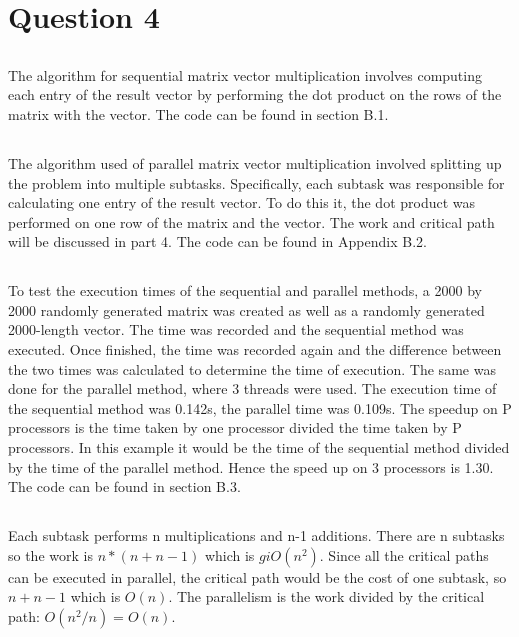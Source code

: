 \documentclass[11pt]{article}
\begin{document}
\section{Question 4}

\subsection{}
The algorithm for sequential matrix vector multiplication involves computing each entry of the result vector by performing the dot 
product on the rows of the matrix with the vector. The code can be found in section B.1.

\subsection{}
The algorithm used of parallel matrix vector multiplication involved splitting up the problem into multiple subtasks. Specifically, each 
subtask was responsible for calculating one entry of the result vector. To do this it, the dot product was performed on one row of the 
matrix and the vector. The work and critical path will be discussed in part 4. The code can be found in Appendix B.2.

\subsection{}
To test the execution times of the sequential and parallel methods, a 2000 by 2000 randomly generated matrix was created as well as a 
randomly generated 2000-length vector. The time was recorded and the sequential method was executed. Once finished, the time was 
recorded again and the difference between the two times was calculated to determine the time of execution. The same was done for the 
parallel method, where 3 threads were used. The execution time of the sequential method was 0.142s, the parallel time was 0.109s. The 
speedup on P processors is the time taken by one processor divided the time taken by P processors. In this example it would be the time 
of the sequential method divided by the time of the parallel method. Hence the speed up on 3 processors is 1.30. The code can be found 
in section B.3.

\subsection{}
Each subtask performs n multiplications and n-1 additions. There are n subtasks so the work is $n*(n+n-1)$ which is $giO(n^2)$. Since all 
the critical paths can be executed in parallel, the critical path would be the cost of one subtask, so $n+n-1$ which is $O(n)$. The 
parallelism is the work divided by the critical path: $O(n^2/n) = O(n)$.
\end{document}

